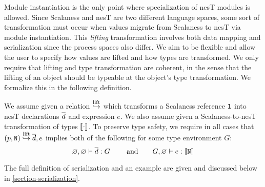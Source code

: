 Module instantiation is the only point where specialization of nesT modules is allowed.
Since Scalaness and nesT are two different language spaces, some sort of transformation must
occur when values migrate from Scalaness to nesT via module instantiation. This \emph{lifting}
transformation involves both data mapping and serialization since the process spaces also
differ. We aim to be flexible and allow the user to specify how values are lifted and how types
are transformed. We only require that lifting and type transformation are coherent, in the sense
that the lifting of an object should be typeable at the object's type transformation. We
formalize this in the following definition.%
\begin{definition}
\label{def-lifting}
We assume given a relation $\ser{\jstore}$ which transforms a Scalaness reference $\tt{l}$ into
nesT declarations $\vect{d}$ and expression $e$. We also assume given a Scalaness-to-nesT
transformation of types $\codt{\cdot}$. To preserve type safety, we require in all cases that
$\jref{p}{N} \ser{\jstore} \vect{d}, e$ implies both of the following for some type environment
$G$:
$$
\varnothing, \varnothing \vdash \vect{d} : \tenv \qquad \text{ and} \qquad
 \tenv, \varnothing \vdash e : \codt{\tt{N}} 
$$
\end{definition}
The full definition of serialization and an example are given and discussed below in
\autoref{section-serialization}.

\jmodsemanticsfig

